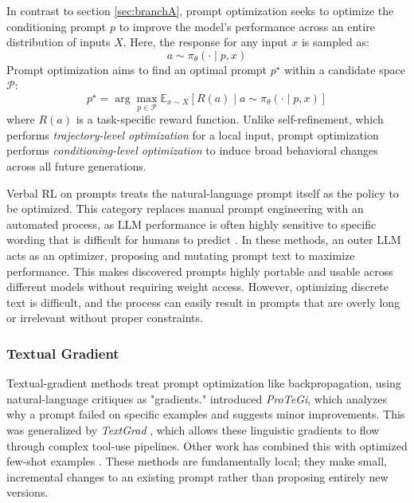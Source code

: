 In contrast to section \ref{sec:branchA}, prompt optimization seeks to optimize the conditioning prompt $p$ to improve the model's performance across an entire distribution of inputs $X$. Here, the response for any input $x$ is sampled as:
\begin{equation}
    a \sim \pi_\theta(\cdot \mid p, x)
\end{equation}
Prompt optimization aims to find an optimal prompt $p^\star$ within a candidate space $\mathcal{P}$:
\begin{equation}
    p^\star = \arg\max_{p \in \mathcal{P}} \mathbb{E}_{x \sim X} \left[ R(a) \mid a \sim \pi_\theta(\cdot \mid p, x) \right]
\end{equation}
where $R(a)$ is a task-specific reward function. Unlike self-refinement, which performs \emph{trajectory-level optimization} for a local input, prompt optimization performs \emph{conditioning-level optimization} to induce broad behavioral changes across all future generations.


Verbal RL on prompts treats the natural-language prompt itself as the policy to be optimized. This category replaces manual prompt engineering with an automated process, as LLM performance is often highly sensitive to specific wording that is difficult for humans to predict \citep{zhou2023ape}. In these methods, an outer LLM acts as an optimizer, proposing and mutating prompt text to maximize performance. This makes discovered prompts highly portable and usable across different models without requiring weight access. However, optimizing discrete text is difficult, and the process can easily result in prompts that are overly long or irrelevant without proper constraints.

\subsubsection{Textual Gradient}

Textual-gradient methods treat prompt optimization like backpropagation, using natural-language critiques as "gradients." \citet{pryzant2023protegi} introduced \textit{ProTeGi}, which analyzes why a prompt failed on specific examples and suggests minor improvements. This was generalized by \textit{TextGrad} \citep{yuksekgonul2024textgrad}, which allows these linguistic gradients to flow through complex tool-use pipelines. Other work has combined this with optimized few-shot examples \citep{agarwal2024promptwizard}. These methods are fundamentally local; they make small, incremental changes to an existing prompt rather than proposing entirely new versions.

